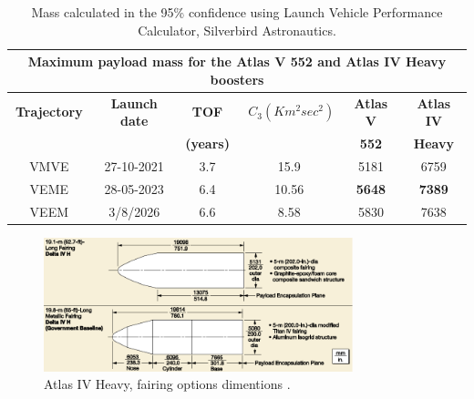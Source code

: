 \begin{table}[htb!]
  \centering
    \begin{tabular}{|c|r|r|r|r|r|}
    \multicolumn{6}{c}{\textbf{Maximum payload mass for the Atlas V 552 and Atlas IV Heavy boosters}} \bigstrut[b]\\
    \hline
    \textbf{Trajectory} & \multicolumn{1}{c|}{\textbf{Launch date}} & \multicolumn{1}{c|}{\textbf{TOF }} & $C_3(Km^{2}sec^{2})$ & \multicolumn{1}{c|}{\textbf{Atlas V }} & \multicolumn{1}{c|}{\textbf{Atlas IV}} \bigstrut[t]\\
    \textbf{} & \multicolumn{1}{c|}{\textbf{}} & \multicolumn{1}{c|}{\textbf{(years)}} & \multicolumn{1}{c|}{\textbf{}} & \multicolumn{1}{c|}{\textbf{552}} & \multicolumn{1}{c|}{\textbf{Heavy}} \bigstrut[b]\\
    \hline
    VMVE  & \multicolumn{1}{c|}{27-10-2021} & \multicolumn{1}{c|}{3.7} & \multicolumn{1}{c|}{15.9} & \multicolumn{1}{c|}{5181} & \multicolumn{1}{c|}{6759} \bigstrut\\
    \hline
    VEME  & \multicolumn{1}{c|}{28-05-2023} & \multicolumn{1}{c|}{6.4} & \multicolumn{1}{c|}{10.56} & \multicolumn{1}{c|}{\textbf{5648}} & \multicolumn{1}{c|}{\textbf{7389}} \bigstrut\\
    \hline
    VEEM  & \multicolumn{1}{c|}{3/8/2026} & \multicolumn{1}{c|}{6.6} & \multicolumn{1}{c|}{8.58} & \multicolumn{1}{c|}{5830} & \multicolumn{1}{c|}{7638} \bigstrut\\
    \hline
    \end{tabular}%
    \caption{Mass calculated in the 95\% confidence using Launch Vehicle Performance Calculator, Silverbird Astronautics.}
  \label{tab:trajKg}%
\end{table}%

\begin{figure}[htb!]
\centering
\includegraphics[width=0.8\textwidth]{figures/Orbiter/fairingsIV.png}
\caption{Atlas IV Heavy, fairing options dimentions \cite{Atlasm}.}
\end{figure}
\newpage
